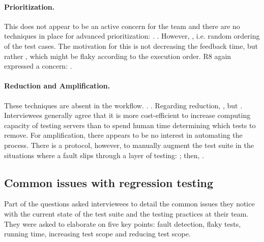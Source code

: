 \paragraph{Prioritization.} This does not appear to be an active concern for the team and there are no techniques in place for advanced prioritization: .
.
However, , i.e. random ordering of the test cases.
The motivation for this is not decreasing the feedback time, but rather , which might be flaky according to the execution order.
R8 again expressed a concern: .

\paragraph{Reduction and Amplification.} These techniques are absent in the workflow. . .
Regarding reduction, , but .
Interviewees generally agree that it is more cost-efficient to increase computing capacity of testing servers than to spend human time determining which tests to remove.
For amplification, there appears to be no interest in automating the process.
There is a protocol, however, to manually augment the test suite in the situations where a fault slips through a layer of testing: ; then, .

\subsection{Common issues with regression testing}

Part of the questions asked interviewees to detail the common issues they notice with the current state of the test suite and the testing practices at their team.
They were asked to elaborate on five key points: fault detection, flaky tests, running time, increasing test scope and reducing test scope.

